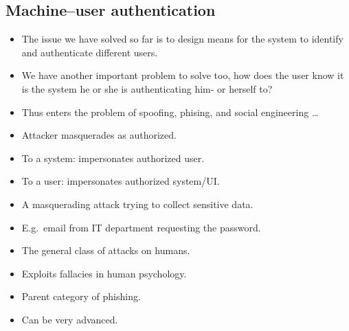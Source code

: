 \subsection{Machine--user authentication}

\begin{frame}
  \begin{remark}
    \begin{itemize}
      \item The issue we have solved so far is to design means for the system to 
        identify and authenticate different users.

      \item We have another important problem to solve too, how does the user 
        know it is the system he or she is authenticating him- or herself to?

      \item Thus enters the problem of spoofing, phising, and social engineering 
        \dots
    \end{itemize}
  \end{remark}
\end{frame}

\begin{frame}
  \begin{definition}
    \begin{itemize}
      \item Attacker masquerades as authorized.
      \item To a system: impersonates authorized user.
      \item To a user: impersonates authorized system/UI.
    \end{itemize}
  \end{definition}
\end{frame}

\begin{frame}
  \begin{definition}[Phishing]
    \begin{itemize}
      \item A masquerading attack trying to collect sensitive data.
      \item E.g.\ email from IT department requesting the password.
    \end{itemize}
  \end{definition}

  \pause{}

  \begin{definition}
    \begin{itemize}
      \item The general class of attacks on humans.
      \item Exploits fallacies in human psychology.
      \item Parent category of phishing.
      \item Can be very advanced.
    \end{itemize}
  \end{definition}
\end{frame}

